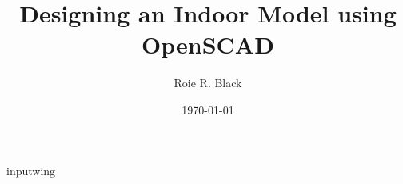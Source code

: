 \documentclass[10pt,twocolumn]{article}
\author{Roie R. Black}
\date{\today}
\title{Designing an Indoor Model using OpenSCAD}
\begin{document}
\maketitle





input{wing}










\end{document}
